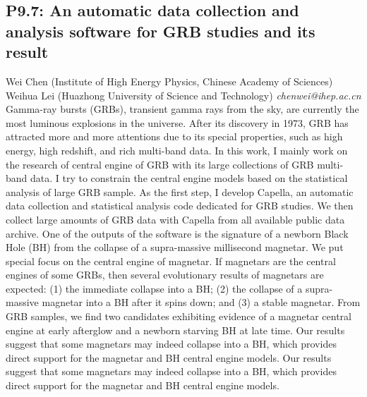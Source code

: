 \documentclass{report}
\begin{document}
\subsection*{P9.7: An automatic data collection and analysis software for GRB studies and its result}
\bigskip
Wei Chen (Institute of High Energy Physics, Chinese Academy of Sciences) \newline Weihua Lei (Huazhong University of Science and Technology) \newline   \newline   \newline  \newline  \newline\newline
{\it chenwei@ihep.ac.cn}\newline
\newline\newline
Gamma-ray bursts (GRBs), transient gamma rays from the sky, are currently the most luminous explosions in the universe. After its discovery in 1973, GRB has attracted more and more attentions due to its special properties, such as high energy, high redshift, and rich multi-band data.
In this work, I mainly work on the research of central engine of GRB with its large collections of GRB multi-band data. I try to constrain the central engine models based on the statistical analysis of large GRB sample. As the first step, I develop Capella, an automatic data collection and statistical analysis code dedicated for GRB studies. We then collect large amounts of GRB data with Capella from all available public data archive. 
One of the outputs of the software is the signature of a newborn Black Hole (BH) from the collapse of a supra-massive millisecond magnetar. We put special focus on the central engine of magnetar. If magnetars are the central engines of some GRBs, then several evolutionary results of magnetars are expected: (1) the immediate collapse into a BH; (2) the collapse of a supra-massive magnetar into a BH after it spins down; and (3) a stable magnetar. From GRB samples, we find two candidates exhibiting evidence of a magnetar central engine at early afterglow and a newborn starving BH at late time. Our results suggest that some magnetars may indeed collapse into a BH, which provides direct support for the magnetar and BH central engine models. Our results suggest that some magnetars may indeed collapse into a BH, which provides direct support for the magnetar and BH central engine models.\newline
\newpage
\end{document}
